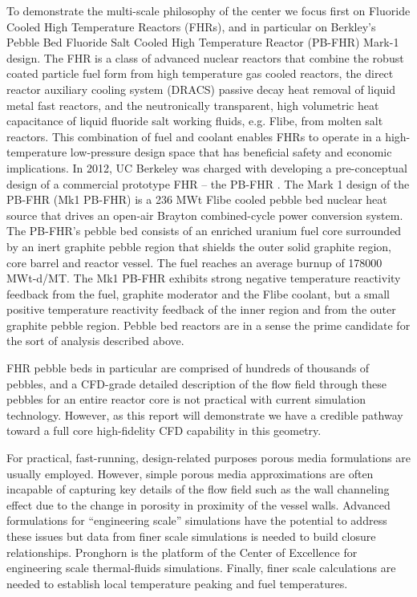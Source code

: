 To demonstrate the multi-scale philosophy of the center we focus first on Fluoride Cooled High Temperature Reactors (FHRs), and in particular on Berkley's Pebble Bed Fluoride Salt Cooled High Temperature Reactor (PB-FHR) Mark-1 design.
The FHR is a class of advanced nuclear reactors that combine the robust coated particle fuel form from high temperature gas cooled reactors, the direct reactor auxiliary cooling system (DRACS) passive decay heat removal of liquid metal fast reactors, and the neutronically transparent, high volumetric heat capacitance of liquid fluoride salt working fluids, e.g. Flibe, from molten salt reactors.
This combination of fuel and coolant enables FHRs to operate in a high-temperature low-pressure design space that has beneficial safety and economic implications.
In 2012, UC Berkeley was charged with developing a pre-conceptual design of a commercial prototype FHR -- the PB-FHR \cite{cisneros2014technical}.
The Mark 1 design of the PB-FHR (Mk1 PB-FHR) is a 236 MWt Flibe cooled pebble bed nuclear heat source that drives an open-air Brayton combined-cycle power conversion system.
The PB-FHR's pebble bed consists of an enriched uranium fuel core surrounded by an inert graphite pebble region that shields the outer solid graphite region, core barrel and reactor vessel.
The fuel reaches an average burnup of 178000 MWt-d/MT.
The Mk1 PB-FHR exhibits strong negative temperature reactivity feedback from the fuel, graphite moderator and the Flibe coolant, but a small positive temperature reactivity feedback of the inner region and from the outer graphite pebble region.
Pebble bed reactors are in a sense the prime candidate for the sort of analysis described above.

FHR pebble beds in particular are comprised of hundreds of thousands of pebbles, and a CFD-grade detailed description of the flow field through these pebbles for an entire reactor core is not practical with current simulation technology.
However, as this report will demonstrate we have a credible pathway toward a full core high-fidelity CFD capability in this geometry.

For practical, fast-running, design-related purposes porous media formulations are usually employed.
However, simple porous media approximations are often incapable of capturing key details of the flow field such as the wall channeling effect due to the change in porosity in proximity of the vessel walls.
Advanced formulations for ``engineering scale'' simulations have the potential to address these issues but data from finer scale simulations is needed to build closure relationships.
Pronghorn is the platform of the Center of Excellence for engineering scale thermal-fluids simulations.
Finally, finer scale calculations are needed to establish local temperature peaking and fuel temperatures.

